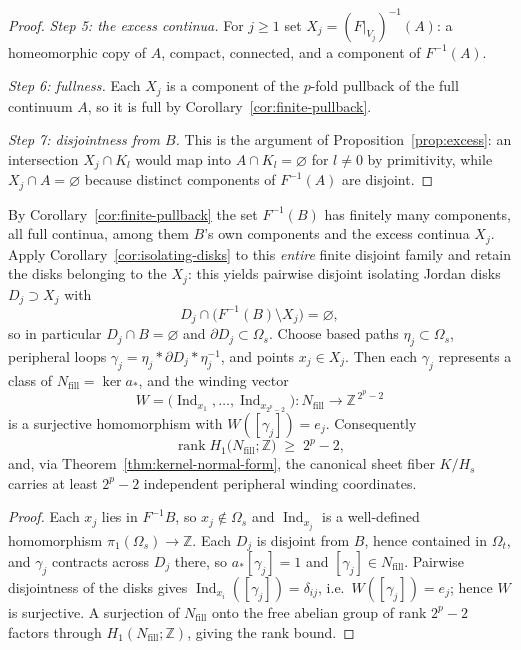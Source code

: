 \begin{proof}
\emph{Step 5: the excess continua.}  For $j\ge1$ set
$X_j=(F|_{V_j})^{-1}(A)$: a homeomorphic copy of $A$, compact,
connected, and a component of $F^{-1}(A)$.

\emph{Step 6: fullness.}  Each $X_j$ is a component of the $p$-fold
pullback of the full continuum $A$, so it is full by
Corollary~\ref{cor:finite-pullback}.

\emph{Step 7: disjointness from $B$.}  This is the argument of
Proposition~\ref{prop:excess}: an intersection $X_j\cap K_l$ would map
into $A\cap K_l=\varnothing$ for $l\neq0$ by primitivity, while
$X_j\cap A=\varnothing$ because distinct components of $F^{-1}(A)$ are
disjoint.
\end{proof}

\begin{corollary}\label{cor:exponential-defect}
By Corollary~\ref{cor:finite-pullback} the set $F^{-1}(B)$ has
finitely many components, all full continua, among them $B$'s own
components and the excess continua $X_j$.  Apply
Corollary~\ref{cor:isolating-disks} to this \emph{entire} finite
disjoint family and retain the disks belonging to the $X_j$: this
yields pairwise disjoint isolating Jordan disks $D_j\supset X_j$ with
\[
 D_j\cap\bigl(F^{-1}(B)\setminus X_j\bigr)=\varnothing ,
\]
so in particular $D_j\cap B=\varnothing$ and
$\partial D_j\subset\Omega_s$.  Choose based paths
$\eta_j\subset\Omega_s$, peripheral loops
$\gamma_j=\eta_j*\partial D_j*\eta_j^{-1}$, and points $x_j\in X_j$.
Then each $\gamma_j$ represents a class of $N_{\mathrm{fill}}=\ker a_*$,
and the winding vector
\[
 W=\bigl(\operatorname{Ind}_{x_1},\dots,
         \operatorname{Ind}_{x_{2^{p}-2}}\bigr)\colon
 N_{\mathrm{fill}}\longrightarrow\mathbb Z^{\,2^{p}-2}
\]
is a surjective homomorphism with $W([\gamma_j])=e_j$.  Consequently
\[
 \operatorname{rank}H_1\bigl(N_{\mathrm{fill}};\mathbb Z\bigr)\;\ge\;2^{p}-2 ,
\]
and, via Theorem~\ref{thm:kernel-normal-form}, the canonical sheet
fiber $K/H_s$ carries at least $2^{p}-2$ independent peripheral winding
coordinates.
\end{corollary}

\begin{proof}
Each $x_j$ lies in $F^{-1}B$, so $x_j\notin\Omega_s$ and
$\operatorname{Ind}_{x_j}$ is a well-defined homomorphism
$\pi_1(\Omega_s)\to\mathbb Z$.  Each $D_j$ is disjoint from $B$, hence
contained in $\Omega_t$, and $\gamma_j$ contracts across $D_j$ there,
so $a_*[\gamma_j]=1$ and $[\gamma_j]\in N_{\mathrm{fill}}$.  Pairwise
disjointness of the disks gives
$\operatorname{Ind}_{x_i}([\gamma_j])=\delta_{ij}$, i.e.\
$W([\gamma_j])=e_j$; hence $W$ is surjective.  A surjection of
$N_{\mathrm{fill}}$ onto the free abelian group of rank $2^{p}-2$
factors through $H_1(N_{\mathrm{fill}};\mathbb Z)$, giving the rank
bound.
\end{proof}

